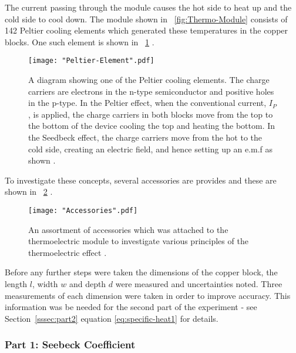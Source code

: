 \documentclass{article}
\newcommand{\figref}[2][\figurename~]{#1\ref{#2}}
\newcommand{\secref}[2][Section~]{#1\ref{#2}}
\begin{document}
\vspace{2mm}
\noindent
The current passing through the module causes the hot side to heat up and the cold side to cool down. The module shown in \figref{fig:Thermo-Module} consists of 142 Peltier cooling elements \cite{Paper02} which generated these temperatures in the copper blocks. One such element is shown in \figref{fig:Peltier-element} \cite{Paper02}.

\begin{figure}[h]
\centering
\texttt{[image: "Peltier-Element".pdf]}
\caption{A diagram showing one of the Peltier cooling elements. The charge carriers are electrons in the n-type semiconductor and positive holes in the p-type. In the Peltier effect,  when the conventional current, $I_P$, is applied, the charge carriers in both blocks move from the top to the bottom of the device \cite{Paper02} cooling the top and heating the bottom. In the Seedbeck effect, the charge carriers move from the hot to the cold side, creating an electric field, and hence setting up an e.m.f as shown \cite{Paper02}.}
\label{fig:Peltier-element}
\end{figure}

\newpage
\vspace{2mm}  
\noindent
To investigate these concepts, several accessories are provides and these are shown in \figref{fig:accessories} \cite{Paper02}.

\begin{figure}[h]
\centering
\texttt{[image: "Accessories".pdf]}
\caption{An assortment of accessories which was attached to the thermoelectric module to investigate various principles of the thermoelectric effect \cite{Paper02}.}
\label{fig:accessories}
\end{figure}

\vspace{2mm}  
\noindent    
Before any further steps were taken the dimensions of the copper block, the length $l$, width $w$ and depth $d$ were measured and uncertainties noted. Three measurements of each dimension were taken in order to improve accuracy. This information was be needed for the second part of the experiment - see \secref{sssec:part2} equation \eqref{eq:specific-heat1} for details.

\subsubsection{Part 1: Seebeck Coefficient}
\label{sssec:part1}
\end{document}
